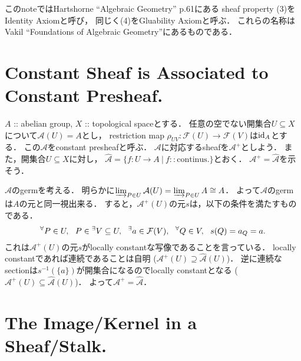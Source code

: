 \documentclass[a4paper]{jsarticle}
\newcommand{\shA}{\mathcal{A}}
\newcommand{\shF}{\mathcal{F}}
\begin{document}
    このnoteではHartshorne ``Algebraic Geometry'' p.61にある
    sheaf property (3)をIdentity Axiomと呼び，
    同じく(4)をGluability Axiomと呼ぶ．
    これらの名称はVakil ``Foundations of Algebraic Geometry''にあるものである．

\section{Constant Sheaf is Associated to Constant Presheaf.} %
    $A$ :: abelian group, $X$ :: topological spaceとする．
    任意の空でない開集合$U \subseteq X$について$\shA(U)=A$とし，
    restriction map $\rho_{UV}: \shF(U) \to \shF(V)$は$\mathrm{id}_{A}$とする．
    この$\shA$をconstant presheafと呼ぶ．
    $\shA$に対応するsheafを$\shA^+$としよう．
    また，開集合$U \subseteq X$に対し，
    $\hat{\shA}=\{ f:U \to A ~|~ f :: \text{continus}. \}$とおく．
    $\shA^+=\hat{\shA}$を示そう．
    
    $\shA$のgermを考える．
    明らかに$\varinjlim_{P \in U} \shA(U)=\varinjlim_{P \in U} A \cong A$．
    よって$\shA$のgermは$A$の元と同一視出来る．
    すると，$\shA^+(U)$の元$s$は，以下の条件を満たすものである．
    \[
        \Forall{P \in U} P \in {}^{\exists}V \subseteq U,~~ \Exists{a \in \shF(V)}
        \Forall{Q \in V} s(Q)=a_Q=a.
    \]
    これは$\shA^+(U)$の元$s$がlocally constantな写像であることを言っている．
    locally constantであれば連続であることは自明
    ($\shA^+(U) \supseteq \hat{\shA}(U)$)．
    逆に連続なsectionは$s^{-1}(\{a\})$が開集合になるのでlocally constantとなる
    ($\shA^+(U) \subseteq \hat{\shA}(U)$)．
    よって$\shA^+=\hat{\shA}$．

\section{The Image/Kernel in a Sheaf/Stalk.} %
\end{document}
